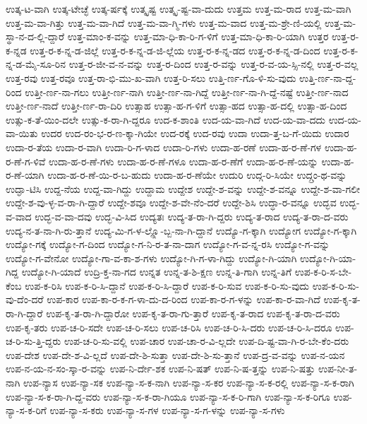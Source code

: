 {ಉತ್ಕ-ಟ-ವಾಗಿ
ಉತ್ಕ-ಟೇಚ್ಛೆ
ಉತ್ಕ-ರ್ಷಕ್ಕೆ
ಉತ್ಕೃಷ್ಟ
ಉತ್ಕೃ-ಷ್ಟ-ವಾ-ದುದು
ಉತ್ತಮ
ಉತ್ತ-ಮ-ರಾದ
ಉತ್ತ-ಮ-ವಾಗಿ
ಉತ್ತ-ಮ-ವಾ-ಗಿತ್ತು
ಉತ್ತ-ಮ-ವಾ-ಗಿದೆ
ಉತ್ತ-ಮ-ವಾ-ಗ್ಮಿ-ಗಳು
ಉತ್ತ-ಮ-ವಾದ
ಉತ್ತ-ಮ-ಶ್ರೇ-ಣಿ-ಯಲ್ಲಿ
ಉತ್ತ-ಮ-ಸ್ಥಾ-ನ-ದ-ಲ್ಲಿ-ದ್ದಾರೆ
ಉತ್ತ-ಮಾಂ-ಕ-ವನ್ನು
ಉತ್ತ-ಮಾ-ಧಿ-ಕಾ-ರಿ-ಗ-ಳಿಗೆ
ಉತ್ತ-ಮಾ-ಧಿ-ಕಾ-ರಿ-ಯಾಗಿ
ಉತ್ತರ
ಉತ್ತ-ರ-ಕ-ನ್ನಡ
ಉತ್ತ-ರ-ಕ-ನ್ನ-ಡ-ಜಿಲ್ಲೆ
ಉತ್ತ-ರ-ಕ-ನ್ನ-ಡ-ಜಿ-ಲ್ಲೆಯ
ಉತ್ತ-ರ-ಕ-ನ್ನ-ಡದ
ಉತ್ತ-ರ-ಕ-ನ್ನ-ಡ-ದಿಂದ
ಉತ್ತ-ರ-ಕ-ನ್ನ-ಡ-ಮೈ-ಸೂ-ರಿನ
ಉತ್ತ-ರ-ಜೀ-ವ-ನ-ವನ್ನು
ಉತ್ತ-ರ-ದಿಂದ
ಉತ್ತ-ರ-ವನ್ನು
ಉತ್ತ-ರ-ವ-ಯ-ಸ್ಸಿ-ನಲ್ಲಿ
ಉತ್ತ-ರ-ವಲ್ಲ
ಉತ್ತ-ರವು
ಉತ್ತ-ರವೂ
ಉತ್ತ-ರಾ-ಭಿ-ಮು-ಖ-ವಾಗಿ
ಉತ್ತ-ರಿ-ಸಲು
ಉತ್ತಿ-ರ್ಣ-ಗೊ-ಳಿ-ಸು-ವುದು
ಉತ್ತಿ-ರ್ಣ-ನಾ-ದ್ದ-ರಿಂದ
ಉತ್ತೀ-ರ್ಣ-ನಾ-ಗಲು
ಉತ್ತೀ-ರ್ಣ-ನಾಗಿ
ಉತ್ತೀ-ರ್ಣ-ನಾ-ಗಿದ್ದೆ
ಉತ್ತೀ-ರ್ಣ-ನಾ-ಗಿ-ದ್ದೆ-ನಷ್ಟೆ
ಉತ್ತೀ-ರ್ಣ-ನಾದ
ಉತ್ತೀ-ರ್ಣ-ನಾದೆ
ಉತ್ತೀ-ರ್ಣ-ರಾ-ದಿರಿ
ಉತ್ಸಾಹ
ಉತ್ಸಾ-ಹ-ಗ-ಳಿಗೆ
ಉತ್ಸಾ-ಹದ
ಉತ್ಸಾ-ಹ-ದಲ್ಲಿ
ಉತ್ಸಾ-ಹ-ದಿಂದ
ಉತ್ಸು-ಕ-ತೆ-ಯಿಂ-ದಲೇ
ಉತ್ಸು-ಕ-ರಾ-ಗಿ-ದ್ದರೂ
ಉದ-ಕ-ಶಾಂತಿ
ಉದ-ಯ-ವಾ-ಗಿದೆ
ಉದ-ಯ-ವಾ-ದದು
ಉದ-ಯ-ವಾ-ಯಿತು
ಉದರ
ಉದ-ರಂ-ಭ-ರ-ಣ-ಕ್ಕಾ-ಗಿಯೇ
ಉದ-ರಕ್ಕೆ
ಉದ-ರವು
ಉದಾ
ಉದಾ-ತ್ತ-ಬ-ಗೆ-ಯಿದು
ಉದಾರ
ಉದಾ-ರ-ತೆಯ
ಉದಾ-ರ-ವಾಗಿ
ಉದಾ-ರಿ-ಗ-ಳಾದ
ಉದಾ-ರಿ-ಗಳು
ಉದಾ-ಹ-ರಣೆ
ಉದಾ-ಹ-ರ-ಣೆ-ಗಳ
ಉದಾ-ಹ-ರ-ಣೆ-ಗ-ಳಿವೆ
ಉದಾ-ಹ-ರ-ಣೆ-ಗಳು
ಉದಾ-ಹ-ರ-ಣೆ-ಗಳೂ
ಉದಾ-ಹ-ರ-ಣೆಗೆ
ಉದಾ-ಹ-ರ-ಣೆ-ಯನ್ನು
ಉದಾ-ಹ-ರ-ಣೆ-ಯಾಗಿ
ಉದಾ-ಹ-ರ-ಣೆ-ಯಿ-ರ-ಬ-ಹುದು
ಉದಾ-ಹ-ರ-ಣೆಯೇ
ಉದುರಿ
ಉದ್ಗ-ರಿ-ಸಿಯೇ
ಉದ್ಗ್ರಂ-ಥ-ವನ್ನು
ಉದ್ಘಾ-ಟಿಸಿ
ಉದ್ದ-ನೆಯ
ಉದ್ದ-ವಾ-ಗಿದ್ದು
ಉದ್ದಾಮ
ಉದ್ದೇಶ
ಉದ್ದೇ-ಶ-ವನ್ನು
ಉದ್ದೇ-ಶ-ವನ್ನೂ
ಉದ್ದೇ-ಶ-ವಾ-ಗಲೀ
ಉದ್ದೇ-ಶ-ವು-ಳ್ಳ-ವ-ರಾ-ಗಿ-ದ್ದಾರೆ
ಉದ್ದೇ-ಶವೂ
ಉದ್ದೇ-ಶ-ವೇ-ನೆಂ-ದರೆ
ಉದ್ದೇ-ಶಿಸಿ
ಉದ್ಧಾ-ರ-ವನ್ನೂ
ಉದ್ಭವ
ಉದ್ಭ-ವ-ವಾದ
ಉದ್ಭ-ವ-ವಾ-ದವು
ಉದ್ಭ-ವಿ-ಸಿದ
ಉದ್ಯತಃ
ಉದ್ಯ-ತ-ರಾ-ಗಿ-ದ್ದರು
ಉದ್ಯ-ತ-ರಾದ
ಉದ್ಯ-ತ-ರಾ-ದ-ವರು
ಉದ್ಯ-ನ-ತ-ನಾ-ಗಿ-ರು-ತ್ತಾನೆ
ಉದ್ಯ-ಮಿ-ಗ-ಳ-ಲ್ಲ್ಲೊ-ಬ್ಬ-ನಾ-ಗಿ-ದ್ದಾನೆ
ಉದ್ಯೊ-ಗ-ಕ್ಕಾಗಿ
ಉದ್ಯೋಗ
ಉದ್ಯೋ-ಗ-ಕ್ಕಾಗಿ
ಉದ್ಯೋ-ಗಕ್ಕೆ
ಉದ್ಯೋ-ಗ-ದಿಂದ
ಉದ್ಯೋ-ಗ-ನಿ-ರ-ತ-ನಾ-ದಾಗ
ಉದ್ಯೋ-ಗ-ವ-ನ್ನ-ರಸಿ
ಉದ್ಯೋ-ಗ-ವನ್ನು
ಉದ್ಯೋ-ಗ-ವೇನೋ
ಉದ್ಯೋ-ಗಾ-ವ-ಕಾ-ಶ-ಗಳು
ಉದ್ಯೋ-ಗಿ-ಗ-ಳಾ-ಗಿದ್ದು
ಉದ್ಯೋ-ಗಿ-ಯಾಗಿ
ಉದ್ಯೋ-ಗಿ-ಯಾ-ಗಿದ್ದ
ಉದ್ಯೋ-ಗಿ-ಯಾದೆ
ಉದ್ರಿ-ಕ್ತ-ನಾ-ಗದ
ಉನ್ನತ
ಉನ್ನ-ತ-ಶಿ-ಕ್ಷಣ
ಉನ್ನ-ತಿ-ಗಾಗಿ
ಉನ್ನ-ತಿಗೆ
ಉಪ-ಕ-ರಿ-ಸ-ಬೇ-ಕೆಂಬ
ಉಪ-ಕ-ರಿಸಿ
ಉಪ-ಕ-ರಿ-ಸಿ-ದ್ದಾನೆ
ಉಪ-ಕ-ರಿ-ಸಿ-ದ್ದಾರೆ
ಉಪ-ಕ-ರಿ-ಸುವ
ಉಪ-ಕ-ರಿ-ಸು-ವುದು
ಉಪ-ಕ-ರಿ-ಸು-ವು-ದೆಂ-ದರೆ
ಉಪ-ಕಾರ
ಉಪ-ಕಾ-ರ-ಕ-ಗ-ಳಾ-ದು-ದ-ರಿಂದ
ಉಪ-ಕಾ-ರ-ಗ-ಳನ್ನು
ಉಪ-ಕಾ-ರ-ವಾ-ಗಿದೆ
ಉಪ-ಕೃ-ತ-ರಾ-ಗಿ-ದ್ದಾರೆ
ಉಪ-ಕೃ-ತ-ರಾ-ಗಿ-ದ್ದಾರೋ
ಉಪ-ಕೃ-ತ-ರಾ-ಗು-ತ್ತಾರೆ
ಉಪ-ಕೃ-ತ-ರಾದ
ಉಪ-ಕೃ-ತ-ರಾ-ದ-ವರು
ಉಪ-ಕೃ-ತರು
ಉಪ-ಚ-ರಿ-ಸದೇ
ಉಪ-ಚ-ರಿ-ಸಲು
ಉಪ-ಚ-ರಿಸಿ
ಉಪ-ಚ-ರಿ-ಸಿ-ದರು
ಉಪ-ಚ-ರಿ-ಸಿ-ದರೂ
ಉಪ-ಚ-ರಿ-ಸು-ತ್ತಿ-ದ್ದರು
ಉಪ-ಚ-ರಿ-ಸು-ವಲ್ಲಿ
ಉಪ-ಚಾರ
ಉಪ-ಚಾ-ರ-ವಿ-ಲ್ಲದೇ
ಉಪ-ದಿ-ಷ್ಟ-ವಾ-ಗಿ-ರ-ಬೇ-ಕೆಂ-ದರು
ಉಪ-ದೇಶ
ಉಪ-ದೇ-ಶ-ವಿ-ಲ್ಲದೆ
ಉಪ-ದೇ-ಶಿ-ಸುತ್ತಾ
ಉಪ-ದೇ-ಶಿ-ಸು-ತ್ತಾನೆ
ಉಪ-ದ್ರ-ವ-ವನ್ನು
ಉಪ-ನ-ಯನ
ಉಪ-ನ-ಯ-ನ-ಸಂ-ಸ್ಕಾ-ರ-ವನ್ನು
ಉಪ-ನಿ-ರ್ದೇ-ಶಕ
ಉಪ-ನಿ-ಷತ್
ಉಪ-ನಿ-ಷ-ತ್ತನ್ನು
ಉಪ-ನಿ-ಷತ್ತು
ಉಪ-ನೀ-ತ-ನಾಗಿ
ಉಪ-ನ್ಯಾಸ
ಉಪ-ನ್ಯಾ-ಸಕ
ಉಪ-ನ್ಯಾ-ಸ-ಕ-ನಾಗಿ
ಉಪ-ನ್ಯಾ-ಸ-ಕರ
ಉಪ-ನ್ಯಾ-ಸ-ಕ-ರಲ್ಲಿ
ಉಪ-ನ್ಯಾ-ಸ-ಕ-ರಾಗಿ
ಉಪ-ನ್ಯಾ-ಸ-ಕ-ರಾ-ಗಿ-ದ್ದ-ವರು
ಉಪ-ನ್ಯಾ-ಸ-ಕ-ರಾ-ಗಿಯೂ
ಉಪ-ನ್ಯಾ-ಸ-ಕ-ರಿ-ಗಾಗಿ
ಉಪ-ನ್ಯಾ-ಸ-ಕ-ರಿಗೂ
ಉಪ-ನ್ಯಾ-ಸ-ಕ-ರಿಗೆ
ಉಪ-ನ್ಯಾ-ಸ-ಕರು
ಉಪ-ನ್ಯಾ-ಸ-ಗಳ
ಉಪ-ನ್ಯಾ-ಸ-ಗ-ಳನ್ನು
ಉಪ-ನ್ಯಾ-ಸ-ಗಳು
}
